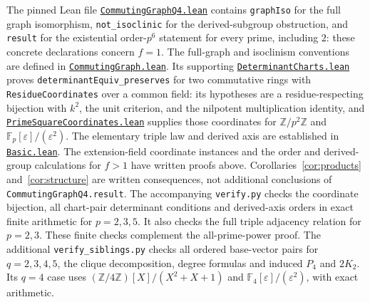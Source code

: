 \documentclass[11pt]{article}
\newcommand{\Fp}{\mathbb F_p}
\newcommand{\ZZ}{\mathbb Z}
\begin{document}
\begin{sloppypar}
The pinned Lean file
\href{https://github.com/the-omega-institute/trureturing/blob/a5ab754b3968a7da271b36fb2b1d878697d70892/D5/S3/FiniteGroups/Heisenberg/CommutingGraphQ4.lean}{\texttt{CommutingGraphQ4.lean}}
contains \texttt{graphIso} for the full graph isomorphism,
\texttt{not\_isoclinic} for the derived-subgroup obstruction, and
\texttt{result} for the existential order-$p^6$ statement for every prime,
including $2$: these concrete declarations concern $f=1$.
The full-graph and isoclinism conventions are defined in
\href{https://github.com/the-omega-institute/trureturing/blob/a5ab754b3968a7da271b36fb2b1d878697d70892/D5/S3/FiniteGroups/Heisenberg/CommutingGraph.lean}{\texttt{CommutingGraph.lean}}.
Its supporting
\href{https://github.com/the-omega-institute/trureturing/blob/a5ab754b3968a7da271b36fb2b1d878697d70892/D5/S3/FiniteGroups/Heisenberg/DeterminantCharts.lean}{\texttt{DeterminantCharts.lean}}
proves \texttt{determinantEquiv\_}\allowbreak\texttt{preserves}
for two commutative rings with \texttt{ResidueCoordinates} over a common field:
its hypotheses are a residue-respecting bijection with $k^2$, the unit
criterion, and the nilpotent multiplication identity,
and
\href{https://github.com/the-omega-institute/trureturing/blob/a5ab754b3968a7da271b36fb2b1d878697d70892/D5/S3/FiniteGroups/Heisenberg/PrimeSquareCoordinates.lean}{\texttt{PrimeSquareCoordinates.lean}}
supplies those coordinates for $\ZZ/p^2\ZZ$ and
$\Fp[\varepsilon]/(\varepsilon^2)$.
The elementary triple law and derived axis are established in
\href{https://github.com/the-omega-institute/trureturing/blob/a5ab754b3968a7da271b36fb2b1d878697d70892/D5/S3/FiniteGroups/Heisenberg/Basic.lean}{\texttt{Basic.lean}}.
The extension-field coordinate instances and the order and derived-group
calculations for $f>1$ have written proofs above.
Corollaries~\ref{cor:products} and~\ref{cor:structure} are written consequences,
not additional conclusions of \texttt{CommutingGraphQ4.result}.
The accompanying \texttt{verify.py} checks the coordinate bijection,
all chart-pair determinant conditions and derived-axis orders in exact
finite arithmetic for $p=2,3,5$. It also checks the full triple adjacency
relation for $p=2,3$. These finite checks complement the all-prime-power proof.
The additional \texttt{verify\_siblings.py} checks all ordered base-vector
pairs for $q=2,3,4,5$, the clique decomposition, degree formulas and induced
$P_4$ and $2K_2$. Its $q=4$ case uses $(\ZZ/4\ZZ)[X]/(X^2+X+1)$ and
$\mathbb F_4[\varepsilon]/(\varepsilon^2)$, with exact arithmetic.
\end{sloppypar}
\end{document}
